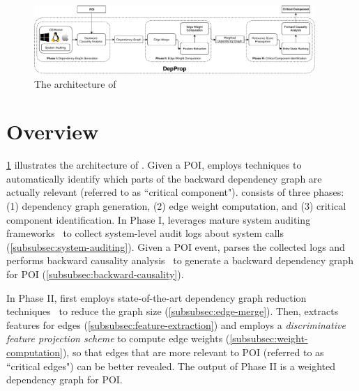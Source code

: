 \begin{figure}[t]
    \centering
    \includegraphics[width=0.95\textwidth,clip]{figs/architecture.pdf}
    \caption{The architecture of \tool}
    \label{fig:architecture}
\end{figure}


\section{Overview}
\label{sec:overview}



\cref{fig:architecture} illustrates the architecture of \tool.
%
Given a POI, \tool employs techniques to automatically identify which parts of the backward dependency graph are actually relevant (referred to as ``critical component").
\tool consists of three phases: (1) dependency graph generation, (2) edge weight computation, and (3) critical component identification.
%
In Phase I, \tool leverages mature system auditing frameworks~\cite{auditd,etw,dtrace,sysdig}
to collect system-level audit logs about system calls (\cref{subsubsec:system-auditing}).
Given a POI event, \tool parses the collected logs and performs backward causality analysis~\cite{backtracking,backtracking2} to generate a backward dependency graph for POI (\cref{subsubsec:backward-causality}).

%
In Phase II, \tool first employs state-of-the-art dependency graph reduction techniques~\cite{reduction} to reduce the graph size
(\cref{subsubsec:edge-merge}).
Then, \tool extracts features for edges (\cref{subsubsec:feature-extraction})
and employs a \emph{discriminative feature projection scheme} to compute edge weights (\cref{subsubsec:weight-computation}), so that edges that are more relevant to POI (referred to as ``critical edges") can be better revealed. 
The output of Phase II is a weighted dependency graph for POI.

